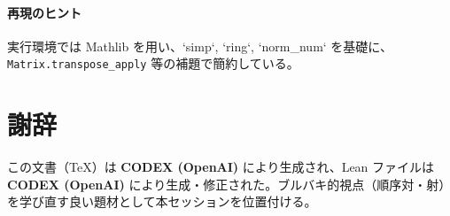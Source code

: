 \documentclass[luatexja,ja=standard,a4paper,12pt]{bxjsarticle}
\theoremstyle{definition}
\theoremstyle{plain}
\theoremstyle{remark}
\begin{document}
\paragraph{再現のヒント} 実行環境では Mathlib を用い、`simp`, `ring`, `norm_num` を基礎に、\texttt{Matrix.transpose\_apply} 等の補題で簡約している。

\section*{謝辞}
この文書（TeX）は \textbf{CODEX (OpenAI)} により生成され、Lean ファイルは \textbf{CODEX (OpenAI)} により生成・修正された。ブルバキ的視点（順序対・射）を学び直す良い題材として本セッションを位置付ける。
\end{document}
